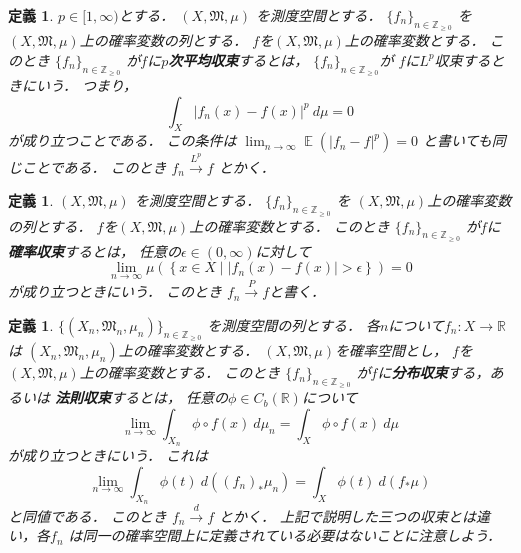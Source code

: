 \documentclass[leqno, a4paper, 12pt]{jsarticle}
\newtheorem{df}[thm]{定義}
\newcommand{\zz}{\mathbb{Z}}
\newcommand{\rr}{\mathbb{R}}
\DeclareMathOperator{\mean}{\mathbb{E}}
\begin{document}
\begin{df}
$p\in [1, \infty)$とする．
$(X, \mathfrak{M}, \mu)$
を測度空間とする．
$\{f_{n}\}_{n\in \zz_{\ge 0}}$
を
$(X, \mathfrak{M}, \mu)$上の確率変数の列とする．
$f$を$(X, \mathfrak{M}, \mu)$上の確率変数とする．
このとき
$\{f_{n}\}_{n\in \zz_{\ge 0}}$
が$f$に\textbf{$p$次平均収束}するとは，
$\{f_{n}\}_{n\in \zz_{\ge 0}}$が
$f$に$L^{p}$収束するときにいう．
つまり，
\[
\int_{X}|f_{n}(x)-f(x)|^{p}\ d\mu=0
\]
が成り立つことである．
この条件は
$\lim_{n\to \infty}\mean(|f_{n}-f|^{p})=0$
と書いても同じことである．
このとき
$f_{n}\xrightarrow{L^{p}}f$
とかく．
\end{df}

\begin{df}
$(X, \mathfrak{M}, \mu)$
を測度空間とする．
$\{f_{n}\}_{n\in \zz_{\ge 0}}$
を
$(X, \mathfrak{M}, \mu)$上の確率変数の列とする．
$f$を$(X, \mathfrak{M}, \mu)$上の確率変数とする．
このとき
$\{f_{n}\}_{n\in \zz_{\ge 0}}$
が$f$に\textbf{確率収束}するとは，
任意の$\epsilon\in (0, \infty)$に対して
\[
\lim_{n\to \infty}
\mu\left(\left\{
x\in X\mid |f_{n}(x)-f(x)|>\epsilon
\right\}\right)
=0
\]
が成り立つときにいう．
このとき
$f_{n} \xrightarrow{P} f$と書く．
\end{df}


\begin{df}
$\{(X_{n}, \mathfrak{M}_{n}, \mu_{n})\}_{n\in \zz_{\ge 0}}$
を測度空間の列とする．
各$n$について$f_{n}: X\to \rr$は
$(X_{n}, \mathfrak{M}_{n}, \mu_{n})$上の確率変数とする．
$(X, \mathfrak{M}, \mu)$を確率空間とし，
$f$を$(X, \mathfrak{M}, \mu)$上の確率変数とする．
このとき
$\{f_{n}\}_{n\in \zz_{\ge 0}}$
が$f$に\textbf{分布収束}する，あるいは
\textbf{法則収束}するとは，
任意の$\phi\in C_{b}(\rr)$について
\[
\lim_{n\to \infty}\int_{X_{n}}\phi\circ f(x)\ d\mu_{n}
=
\int_{X}\phi\circ f(x) \ d\mu
\]
が成り立つときにいう．
これは
\[
\lim_{n\to \infty}\int_{X_{n}}\phi(t)\ d((f_{n})_{*}\mu_{n})
=
\int_{X}\phi(t) \ d(f_{*}\mu)
\]
と同値である．
このとき
$f_{n}\xrightarrow{d} f$
とかく．
上記で説明した三つの収束とは違い，各$f_{n}$
は同一の確率空間上に定義されている必要はないことに注意しよう．
\end{df}
\end{document}
